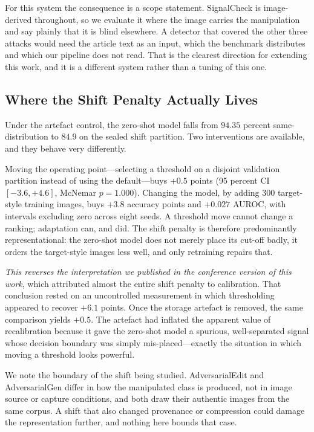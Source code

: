 \documentclass[journal]{IEEEtran}
\newcommand{\sysname}{SignalCheck}
\begin{document}
For this system the consequence is a scope statement. \sysname{} is
image-derived throughout, so we evaluate it where the image carries the
manipulation and say plainly that it is blind elsewhere. A detector that
covered the other three attacks would need the article text as an input, which
the benchmark distributes and which our pipeline does not read. That is the
clearest direction for extending this work, and it is a different system rather
than a tuning of this one.

\subsection{Where the Shift Penalty Actually Lives}
\label{sec:shiftdiscussion}

Under the artefact control, the zero-shot model falls from $94.35$ percent
same-distribution to $84.9$ on the sealed shift partition. Two interventions
are available, and they behave very differently.

Moving the operating point---selecting a threshold on a disjoint validation
partition instead of using the default---buys $+0.5$ points
(95 percent CI $[-3.6, +4.6]$, McNemar $p = 1.000$). Changing the model, by
adding 300 target-style training images, buys $+3.8$ accuracy points and
$+0.027$ AUROC, with intervals excluding zero across eight seeds. A threshold
move cannot change a ranking; adaptation can, and did. The shift penalty is
therefore predominantly representational: the zero-shot model does not merely
place its cut-off badly, it orders the target-style images less well, and only
retraining repairs that.

\emph{This reverses the interpretation we published in the conference version
of this work}, which attributed almost the entire shift penalty to calibration.
That conclusion rested on an uncontrolled measurement in which thresholding
appeared to recover $+6.1$ points. Once the storage artefact is removed, the
same comparison yields $+0.5$. The artefact had inflated the apparent value of
recalibration because it gave the zero-shot model a spurious, well-separated
signal whose decision boundary was simply mis-placed---exactly the situation in
which moving a threshold looks powerful.

We note the boundary of the shift being studied. AdversarialEdit and
AdversarialGen differ in how the manipulated class is produced, not in image
source or capture conditions, and both draw their authentic images from the
same corpus. A shift that also changed provenance or compression could damage
the representation further, and nothing here bounds that case.
\end{document}
